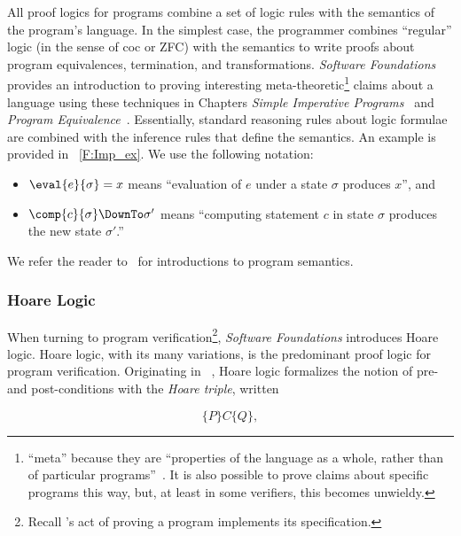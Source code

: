 All proof logics for programs combine a set of logic rules with the semantics of
the program's language. In the simplest case, the programmer combines
``regular'' logic (in the sense of \gls{coc} or ZFC) with the semantics to write
proofs about program equivalences, termination, and transformations.
\emph{Software Foundations} provides an introduction to proving interesting
meta-theoretic\footnote{``meta'' because they are ``properties of the language
as a whole, rather than of particular programs''~\cite{Pierce:SF2}. It is also
possible to prove claims about specific programs this way, but, at least in some
verifiers, this becomes unwieldy.} claims about a language using these
techniques in Chapters \emph{Simple Imperative Programs}~\cite{Pierce:SF1} and
\emph{Program Equivalence}~\cite{Pierce:SF2}. Essentially, standard reasoning
rules about logic formulae are combined with the inference rules that define the
semantics. An example is provided in \figurename~\ref{F:Imp_ex}. We use the
following notation:

\begin{itemize}
    \item \(\eval{e}{\sigma} = x\) means ``evaluation of \(e\) under a state
        \(\sigma\) produces \(x\)'', and

    \item \(\comp{c}{\sigma} \DownTo \sigma'\) means ``computing statement \(c\)
        in state \(\sigma\) produces the new state \(\sigma'\).''
\end{itemize}

We refer the reader to~\cite{Winskel_1993,Harper_2016} for introductions to
program semantics.

\subsubsection{Hoare Logic}

When turning to program verification\footnote{Recall \citeauthor{EWD:EWD1036}'s
act of proving a program implements its specification.}, \emph{Software
Foundations} introduces Hoare logic. Hoare logic, with its many variations, is
the predominant proof logic for program verification. Originating in
\citeyear{Hoare_1969}~\cite{Hoare_1969}, Hoare logic formalizes the notion of
pre- and post-conditions with the \emph{Hoare triple}, written

\begin{equation*}
    \{P\} C \{Q\},
\end{equation*}

